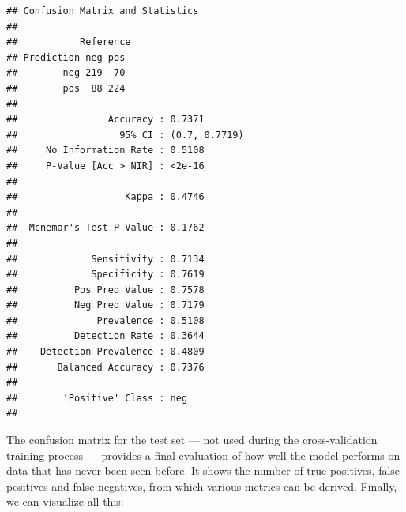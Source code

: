 \documentclass[
]{book}
\begin{document}
\begin{verbatim}
## Confusion Matrix and Statistics
## 
##           Reference
## Prediction neg pos
##        neg 219  70
##        pos  88 224
##                                        
##                Accuracy : 0.7371       
##                  95% CI : (0.7, 0.7719)
##     No Information Rate : 0.5108       
##     P-Value [Acc > NIR] : <2e-16       
##                                        
##                   Kappa : 0.4746       
##                                        
##  Mcnemar's Test P-Value : 0.1762       
##                                        
##             Sensitivity : 0.7134       
##             Specificity : 0.7619       
##          Pos Pred Value : 0.7578       
##          Neg Pred Value : 0.7179       
##              Prevalence : 0.5108       
##          Detection Rate : 0.3644       
##    Detection Prevalence : 0.4809       
##       Balanced Accuracy : 0.7376       
##                                        
##        'Positive' Class : neg          
## 
\end{verbatim}

The confusion matrix for the test set --- not used during the cross-validation training process --- provides a final evaluation of how well the model performs on data that has never been seen before. It shows the number of true positives, false positives and false negatives, from which various metrics can be derived. Finally, we can visualize all this:
\end{document}
